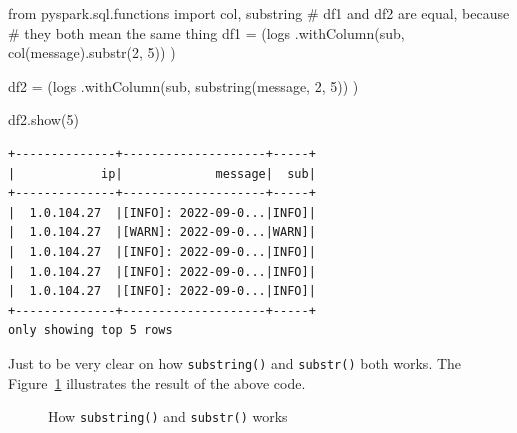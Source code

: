 \documentclass[
  11pt,
  letterpaper,
  DIV=11,
  numbers=noendperiod]{scrreprt}
\newenvironment{Shaded}{\begin{snugshade}}{\end{snugshade}}
\newcommand{\CommentTok}[1]{\textcolor[rgb]{0.37,0.37,0.37}{#1}}
\newcommand{\DecValTok}[1]{\textcolor[rgb]{0.68,0.00,0.00}{#1}}
\newcommand{\ImportTok}[1]{\textcolor[rgb]{0.00,0.46,0.62}{#1}}
\newcommand{\NormalTok}[1]{\textcolor[rgb]{0.00,0.23,0.31}{#1}}
\newcommand{\OperatorTok}[1]{\textcolor[rgb]{0.37,0.37,0.37}{#1}}
\newcommand{\StringTok}[1]{\textcolor[rgb]{0.13,0.47,0.30}{#1}}
\begin{document}
\begin{Shaded}
\begin{Highlighting}[]
\ImportTok{from}\NormalTok{ pyspark.sql.functions }\ImportTok{import}\NormalTok{ col, substring}
\CommentTok{\# \textasciigrave{}df1\textasciigrave{} and \textasciigrave{}df2\textasciigrave{} are equal, because}
\CommentTok{\# they both mean the same thing}
\NormalTok{df1 }\OperatorTok{=}\NormalTok{ (logs}
\NormalTok{    .withColumn(}\StringTok{\textquotesingle{}sub\textquotesingle{}}\NormalTok{, col(}\StringTok{\textquotesingle{}message\textquotesingle{}}\NormalTok{).substr(}\DecValTok{2}\NormalTok{, }\DecValTok{5}\NormalTok{))}
\NormalTok{)}

\NormalTok{df2 }\OperatorTok{=}\NormalTok{ (logs}
\NormalTok{    .withColumn(}\StringTok{\textquotesingle{}sub\textquotesingle{}}\NormalTok{, substring(}\StringTok{\textquotesingle{}message\textquotesingle{}}\NormalTok{, }\DecValTok{2}\NormalTok{, }\DecValTok{5}\NormalTok{))}
\NormalTok{)}

\NormalTok{df2.show(}\DecValTok{5}\NormalTok{)}
\end{Highlighting}
\end{Shaded}

\begin{verbatim}
+--------------+--------------------+-----+
|            ip|             message|  sub|
+--------------+--------------------+-----+
|  1.0.104.27  |[INFO]: 2022-09-0...|INFO]|
|  1.0.104.27  |[WARN]: 2022-09-0...|WARN]|
|  1.0.104.27  |[INFO]: 2022-09-0...|INFO]|
|  1.0.104.27  |[INFO]: 2022-09-0...|INFO]|
|  1.0.104.27  |[INFO]: 2022-09-0...|INFO]|
+--------------+--------------------+-----+
only showing top 5 rows
\end{verbatim}

Just to be very clear on how \texttt{substring()} and \texttt{substr()}
both works. The Figure~\ref{fig-substring-start-length} illustrates the
result of the above code.

\begin{figure}


\caption{\label{fig-substring-start-length}How \texttt{substring()} and
\texttt{substr()} works}

\end{figure}%
\end{document}
